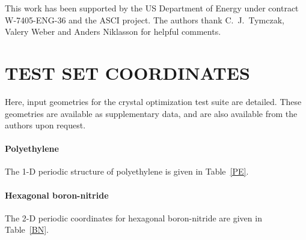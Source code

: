\twolinestyle{\documentclass[prb,preprint]{revtex4}}
\begin{document}
\begin{acknowledgments}
 This work has been supported by the US Department of Energy 
 under contract W-7405-ENG-36 and the ASCI project.  The authors
 thank C.~J.~Tymczak, Valery Weber and Anders Niklasson for helpful 
 comments.
\end{acknowledgments}


%

\appendix

\section{TEST SET COORDINATES}\label{Geometries}

Here, input geometries for the crystal optimization test suite are detailed.  These
geometries are available as supplementary data, and are also available from the
authors upon request.

\paragraph{Polyethylene}
The 1-D periodic structure of polyethylene is given in Table~\ref{PE}.
\paragraph{Hexagonal boron-nitride}
The 2-D periodic coordinates for hexagonal boron-nitride are given in Table~\ref{BN}.
\end{document}
